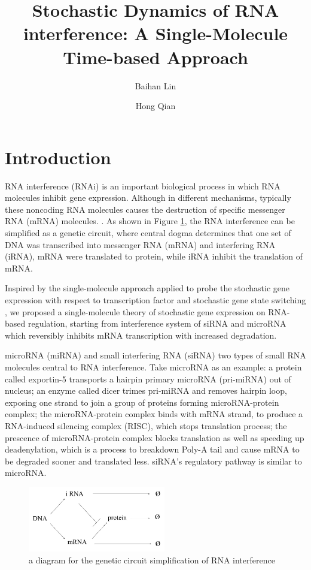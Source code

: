 \documentclass[fleqn,10pt]{wlscirep}
\title{Stochastic Dynamics of RNA interference: A Single-Molecule Time-based Approach}
\author[1*]{Baihan Lin}
\author[1]{Hong Qian}
\affil[1]{Department of Applied Mathematics, University of Washington, Seattle, WA 98195, USA}
\affil[*]{doerlbh@gmail.com}
\begin{document}
\flushbottom
\maketitle

\section*{Introduction}

RNA interference (RNAi) is an important biological process in which RNA molecules inhibit gene expression. Although in different mechanisms, typically these noncoding RNA molecules causes the destruction of specific messenger RNA (mRNA) molecules. \cite{MacRae195}. As shown in Figure \ref{fig:diagram}, the RNA interference can be simplified as a genetic circuit, where central dogma determines that one set of DNA was transcribed into messenger RNA (mRNA) and interfering RNA (iRNA), mRNA were translated to protein, while iRNA inhibit the translation of mRNA.

Inspired by the single-molecule approach applied to probe the stochastic gene expression with respect to transcription factor \cite{Elf1191} and stochastic gene state switching \cite{PhysRevLett.114.078101}, we proposed a single-molecule theory of stochastic gene expression on RNA-based regulation, starting from interference system of siRNA and microRNA which reversibly inhibits mRNA transcription with increased degradation. 

microRNA (miRNA) and small interfering RNA (siRNA) two types of small RNA molecules central to RNA interference. Take microRNA as an example: a protein called exportin-5 transports a hairpin primary microRNA (pri-miRNA) out of nucleus; an enzyme called dicer trimes pri-miRNA and removes hairpin loop, exposing one strand to join a group of proteins forming microRNA-protein complex; the microRNA-protein complex binds with mRNA strand, to produce a RNA-induced silencing complex (RISC), which stops translation process; the prescence of microRNA-protein complex blocks translation as well as speeding up deadenylation, which is a process to breakdown Poly-A tail and cause mRNA to be degraded sooner and translated less. siRNA's regulatory pathway is similar to microRNA.

\begin{figure}[ht]
\centering
\includegraphics[width=6cm]{diagram}
\caption{a diagram for the genetic circuit simplification of RNA interference}
\label{fig:diagram}
\end{figure}
\end{document}
